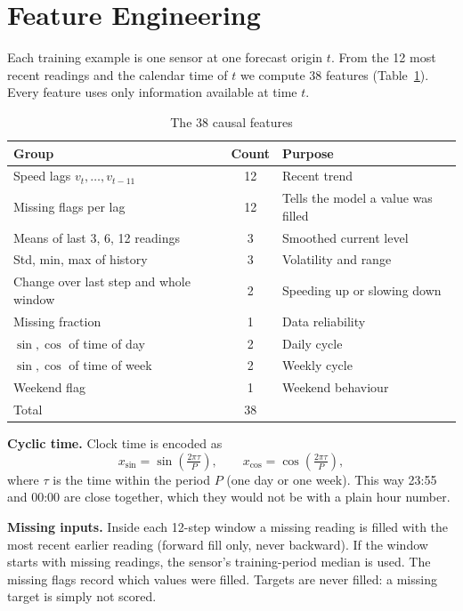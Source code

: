 \documentclass[conference]{IEEEtran}
\begin{document}
\section{Feature Engineering}
\label{sec:features}
Each training example is one sensor at one forecast origin $t$. From the 12 most recent readings and the calendar time of $t$ we compute 38 features (Table~\ref{tab:features}). Every feature uses only information available at time $t$.

\begin{table}[t]
\centering
\caption{The 38 causal features}
\label{tab:features}
\footnotesize
\begin{tabular}{>{\raggedright\arraybackslash}p{}c>{\raggedright\arraybackslash}p{}}
\toprule
Group & Count & Purpose \\
\midrule
Speed lags $v_{t},\dots,v_{t-11}$ & 12 & Recent trend \\
Missing flags per lag & 12 & Tells the model a value was filled \\
Means of last 3, 6, 12 readings & 3 & Smoothed current level \\
Std, min, max of history & 3 & Volatility and range \\
Change over last step and whole window & 2 & Speeding up or slowing down \\
Missing fraction & 1 & Data reliability \\
$\sin,\cos$ of time of day & 2 & Daily cycle \\
$\sin,\cos$ of time of week & 2 & Weekly cycle \\
Weekend flag & 1 & Weekend behaviour \\
\midrule
Total & 38 & \\
\bottomrule
\end{tabular}
\end{table}

\textbf{Cyclic time.} Clock time is encoded as
\begin{equation}
x_{\sin}=\sin\!\left(\tfrac{2\pi\tau}{P}\right),\qquad x_{\cos}=\cos\!\left(\tfrac{2\pi\tau}{P}\right),
\end{equation}
where $\tau$ is the time within the period $P$ (one day or one week). This way 23:55 and 00:00 are close together, which they would not be with a plain hour number.

\textbf{Missing inputs.} Inside each 12-step window a missing reading is filled with the most recent earlier reading (forward fill only, never backward). If the window starts with missing readings, the sensor's training-period median is used. The missing flags record which values were filled. Targets are never filled: a missing target is simply not scored.
\end{document}
